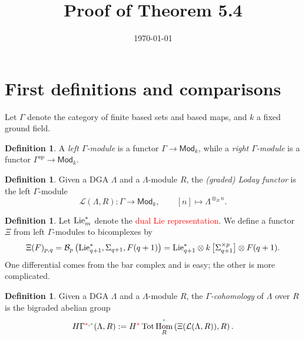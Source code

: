 \documentclass[11pt,reqno
,draft
]{amsart}
\title{Proof of Theorem 5.4}
\date{\today}
\numberwithin{equation}{section}
\numberwithin{figure}{section}
\theoremstyle{definition} %
\newtheorem{definition}[equation]{Definition}%
\DeclareMathOperator{\Hom}{Hom}%
\newcommand{\Ksi}{\Xi}
\newcommand{\Lie}{\mathrm{Lie}}
\newcommand{\Loday}{\mathcal L}
\newcommand{\redstar}{{\color{red}\**}}
\newcommand{\greenstar}{{\color{ForestGreen}\**}}
\newcommand{\Mod}{\mathsf{Mod}}
\DeclareMathOperator{\Tot}{Tot}
\begin{document}


 \maketitle


\section{First definitions and comparisons}


Let $\Gamma$ denote the category of finite based sets and based maps, and $k$ a fixed ground field.
\begin{definition}
        A \textit{left $\Gamma$-module} is a functor $\Gamma \to \Mod_k$, while a
        \textit{right $\Gamma$-module} is a functor $\Gamma^{op} \to \Mod_k$.
\end{definition}

\begin{definition}
        Given a DGA $\Lambda$ and a $\Lambda$-module $R$, the \textit{(graded) Loday functor} is the left $\Gamma$-module
        \[
                \Loday(\Lambda, R) \colon \Gamma \to \Mod_k,
                \qquad
                [n] \mapsto \Lambda^{\otimes_R n}.
        \]
\end{definition}

\begin{definition}
        Let $\Lie_m^{\**}$ denote the \textcolor{red}{dual Lie representation}.
        We define a functor $\Ksi$ from left $\Gamma$-modules to bicomplexes by
        \[
                \Ksi(F)_{p,q} = \mathcal B_p \left( \Lie_{q+1}^{\**}, \Sigma_{q+1}, F(q+1) \right)
                = \Lie_{q+1}^{\**} \otimes k\left[\Sigma_{q+1}^{\times p}\right] \otimes F(q+1).
        \]
        One differential comes from the bar complex and is easy; the other is more complicated.
\end{definition}

\begin{definition}
        Given a DGA $\Lambda$ and a $\Lambda$-module $R$, the \textit{$\Gamma$-cohomology} of $\Lambda$ over $R$ is the bigraded abelian group
        \[
                H\Gamma^{\redstar, \greenstar}(\Lambda, R) := H^{\redstar} \Tot \Hom_R^{\greenstar} \left( \Ksi(\Loday(\Lambda, R)), R \right).
        \]
\end{definition}
\end{document}
